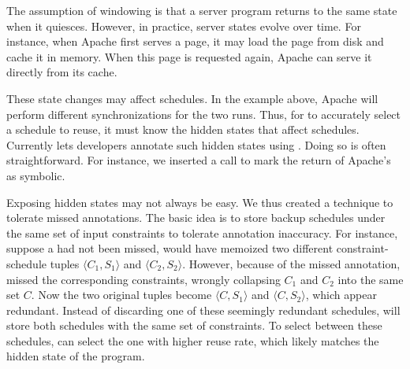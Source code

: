   The assumption of windowing is that a
server program returns to the same state when it quiesces.  However, in
practice, server states evolve over time.  For instance, when Apache first
serves a page, it may load the page from disk and cache it in memory.
When this page is requested again, Apache can serve it directly from its
cache.

These state changes may affect schedules.  In the example above, Apache
will perform different synchronizations for the two runs.  Thus, for
\tern to accurately select a schedule to reuse, it must know the hidden
states that affect schedules.  Currently \tern lets developers annotate
such hidden states using .  Doing so is often
straightforward.  For instance, we inserted a  call to mark
the return of Apache's  as symbolic.

Exposing hidden states may not always be easy.  We thus created a
technique to tolerate missed  annotations.  The basic idea
is to store backup schedules under the same set of input constraints to
tolerate annotation inaccuracy.  For instance, suppose a 
had not been missed, \tern would have memoized two different
constraint-schedule tuples $\langle C_1, S_1 \rangle$ and $\langle C_2,
S_2 \rangle$.  However, because of the missed annotation, \tern missed the
corresponding constraints, wrongly collapsing $C_1$ and $C_2$ into the
same set $C$.  Now the two original tuples become $\langle C, S_1 \rangle$
and $\langle C, S_2 \rangle$, which appear redundant.  Instead of
discarding one of these seemingly redundant schedules, \tern will store both
schedules with the same set of constraints.  To select between these
schedules, \tern can select the one with higher reuse rate, which likely
matches the hidden state of the program.



